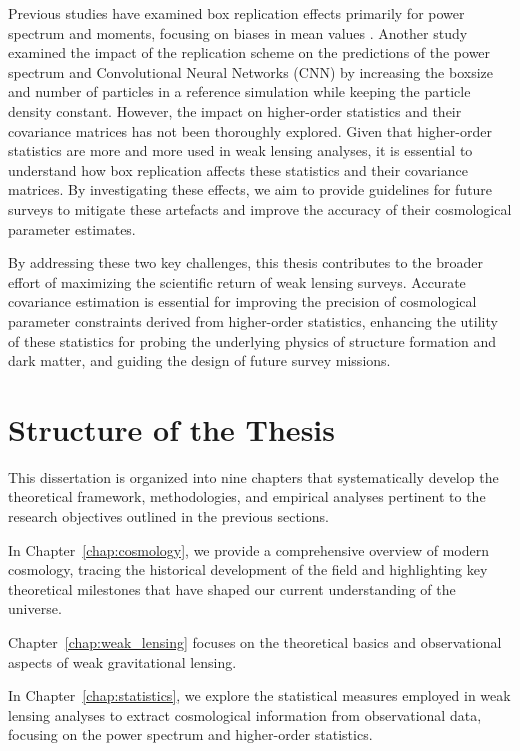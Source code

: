 Previous studies have examined box replication effects primarily for power spectrum and moments, focusing on biases in mean values \citep{2024MNRAS.534.1205C}. Another study \citep{2019PhRvD.100f3514F} examined the impact of the replication scheme on the predictions of the power spectrum and Convolutional Neural Networks (CNN) by increasing the boxsize and number of particles in a reference simulation while keeping the particle density constant. 
However, the impact on higher-order statistics and their covariance matrices has not been thoroughly explored. Given that higher-order statistics are more and more used in weak lensing analyses, it is essential to understand how box replication affects these statistics and their covariance matrices. By investigating these effects, we aim to provide guidelines for future surveys to mitigate these artefacts and improve the accuracy of their cosmological parameter estimates.

By addressing these two key challenges, this thesis contributes to the broader effort of maximizing the scientific return of weak lensing surveys. Accurate covariance estimation is essential for improving the precision of cosmological parameter constraints derived from higher-order statistics, enhancing the utility of these statistics for probing the underlying physics of structure formation and dark matter, and guiding the design of future survey missions.

\section{Structure of the Thesis}
This dissertation is organized into nine chapters that systematically develop the theoretical framework, methodologies, and empirical analyses pertinent to the research objectives outlined in the previous sections.

In Chapter~\ref{chap:cosmology}, we provide a comprehensive overview of modern cosmology, tracing the historical development of the field and highlighting key theoretical milestones that have shaped our current understanding of the universe. 

Chapter~\ref{chap:weak_lensing} focuses on the theoretical basics and observational aspects of weak gravitational lensing. 

In Chapter~\ref{chap:statistics}, we explore the statistical measures employed in weak lensing analyses to extract cosmological information from observational data, focusing on the power spectrum and higher-order statistics. 

